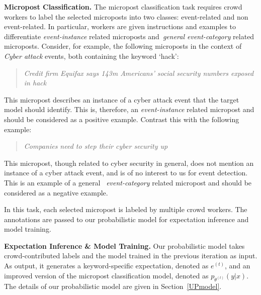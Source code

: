 \documentclass[letterpaper]{article}
\begin{document}
\smallskip
\noindent\textbf{Micropost Classification.} The micropost classification task requires crowd workers to label the selected microposts into two classes: event-related and non event-related. In particular, workers are given instructions and examples to differentiate \emph{event-instance} related microposts and~\emph{general event-category} related microposts. Consider, for example, the following microposts in the context of \emph{Cyber attack} events, both containing the keyword \lq hack':
\begin{quote}
    \emph{Credit firm Equifax says 143m Americans' social security numbers exposed in hack}
\end{quote}
     This micropost describes an instance of a cyber attack event that the target model should identify. This is, therefore, an \emph{event-instance} related micropost and should be considered as a positive example. Contrast this with the following example:

\begin{quote}
    \emph{Companies need to step their cyber security up}
\end{quote}
This micropost, though related to cyber security in general, does not mention an instance of a cyber attack event, and is of no interest to us for event detection. This is an example of a general ~\emph{event-category} related micropost and should be considered as a negative example.

In this task, each selected micropost is labeled by multiple crowd workers. The annotations are passed to our probabilistic model for expectation inference and model training.

\smallskip
\noindent\textbf{Expectation Inference \& Model Training.} Our probabilistic model takes crowd-contributed labels and the model trained in the previous iteration as input. As output, it generates a keyword-specific expectation, denoted as $e^{(t)}$, and an improved version of the micropost classification model, denoted as $p_{\theta^{(t)}}(y|x)$. The details of our probabilistic model are given in Section~\ref{UPmodel}.
\end{document}
